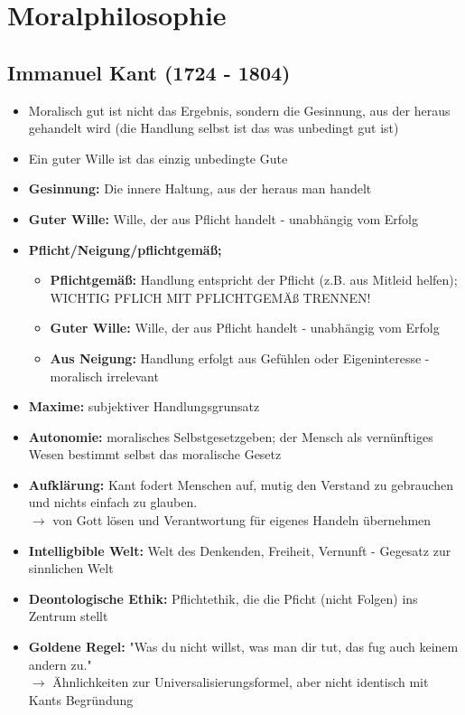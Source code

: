 
\section{Moralphilosophie}


\subsection{Immanuel Kant (1724 - 1804)}
\begin{itemize}
    \item Moralisch gut ist nicht das Ergebnis, sondern die Gesinnung, aus der heraus gehandelt wird (die Handlung selbst ist das was unbedingt gut ist)
    \item Ein guter Wille ist das einzig unbedingte Gute
\end{itemize}

\begin{itemize}
    \item \textbf{Gesinnung:} Die innere Haltung, aus der heraus man handelt
    \item \textbf{Guter Wille:} Wille, der aus Pflicht handelt - unabhängig vom Erfolg
    \item \textbf{Pflicht/Neigung/pflichtgemäß;}
    \begin{itemize}
        \item \textbf{Pflichtgemäß:} Handlung entspricht der Pflicht (z.B. aus Mitleid helfen); \\
        WICHTIG PFLICH MIT PFLICHTGEMÄß TRENNEN!
        \item \textbf{Guter Wille:} Wille, der aus Pflicht handelt - unabhängig vom Erfolg
        \item \textbf{Aus Neigung:} Handlung erfolgt aus Gefühlen oder Eigeninteresse - moralisch irrelevant
    \end{itemize}
    \item \textbf{Maxime:} subjektiver Handlungsgrunsatz
    \item \textbf{Autonomie:} moralisches Selbstgesetzgeben; der Mensch als vernünftiges Wesen bestimmt selbst das moralische Gesetz
    \item \textbf{Aufklärung:} Kant fodert Menschen auf, mutig den Verstand zu gebrauchen und nichts einfach zu glauben. \\
    $\rightarrow$ von Gott lösen und Verantwortung für eigenes Handeln übernehmen
    \item \textbf{Intelligbible Welt:} Welt des Denkenden, Freiheit, Vernunft - Gegesatz zur sinnlichen Welt
    \item \textbf{Deontologische Ethik:} Pflichtethik, die die Pficht (nicht Folgen) ins Zentrum stellt
    \item \textbf{Goldene Regel:} "Was du nicht willst, was man dir tut, das fug auch keinem andern zu." \\
    $\rightarrow$ Ähnlichkeiten zur Universalisierungsformel, aber nicht identisch mit Kants Begründung
\end{itemize}

